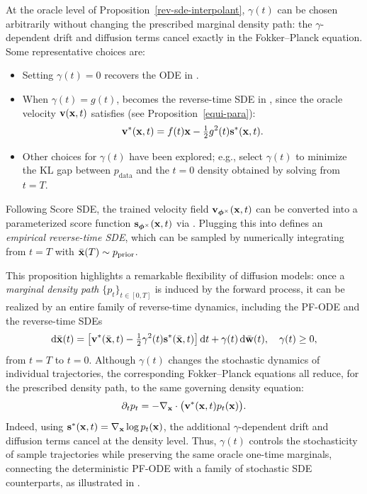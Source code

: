 At the oracle level of Proposition~\ref{rev-sde-interpolant},
$\gamma(t)$ can be chosen arbitrarily without changing the prescribed
marginal density path: the $\gamma$-dependent drift and diffusion terms cancel
exactly in the Fokker--Planck equation. Some representative choices are:
\begin{itemize}
    \item Setting $\gamma(t) = 0$ recovers the ODE in .
    \item When $\gamma(t) = g(t)$,  becomes the reverse-time SDE in , since the oracle velocity ${\mathbf{v}}({\mathbf{x}}, t)$ satisfies (see Proposition~\ref{equi-para}):
    \[
    {\mathbf{v}}^*({\mathbf{x}}, t) = f(t){\mathbf{x}} - \tfrac{1}{2}g^2(t){\mathbf{s}}^*({\mathbf{x}}, t).
    \]
    \item Other choices for $\gamma(t)$ have been explored; e.g., \citet{ma2024sit} select $\gamma(t)$ to minimize the KL gap between $p_{\mathrm{data}}$ and the $t=0$ density obtained by solving  from $t=T$.
\end{itemize}
Following Score SDE, the trained velocity field ${\mathbf{v}}_{\bm{\phi}^\times}({\mathbf{x}}, t)$ can be converted into a parameterized score function ${\mathbf{s}}_{\bm{\phi}^\times}({\mathbf{x}}, t)$ via . Plugging this into  defines an \emph{empirical reverse-time SDE}, which can be sampled by numerically integrating from $t=T$ with $\bar{{\mathbf{x}}}(T) \sim p_{\mathrm{prior}}$.

This proposition highlights a remarkable flexibility of diffusion models:
once a \emph{marginal density path} $\{p_t\}_{t\in[0,T]}$ is induced by the
forward process, it can be realized by an entire family of reverse-time
dynamics, including the PF-ODE and the reverse-time SDEs
\[
\mathop{}\!\mathrm{d}\bar{{\mathbf{x}}}(t)
=
\big[
{\mathbf{v}}^*(\bar{{\mathbf{x}}},t)
-\tfrac12\gamma^2(t){\mathbf{s}}^*(\bar{{\mathbf{x}}},t)
\big]\mathop{}\!\mathrm{d} t
+
\gamma(t)\mathop{}\!\mathrm{d}\bar{{\mathbf{w}}}(t),
\quad
\gamma(t)\geq0,
\]
from $t=T$ to $t=0$. Although $\gamma(t)$ changes the stochastic dynamics of individual
trajectories, the corresponding Fokker--Planck equations all reduce, for the
prescribed density path, to the same governing density equation:
\[
\partial_t p_t
=
-\nabla_{{\mathbf{x}}}\cdot
\bigl({\mathbf{v}}^*({\mathbf{x}},t)p_t({\mathbf{x}})\bigr).
\]
Indeed, using
${\mathbf{s}}^*({\mathbf{x}},t)=\nabla_{{\mathbf{x}}}\log p_t({\mathbf{x}})$, the additional
$\gamma$-dependent drift and diffusion terms cancel at the density level.
Thus, $\gamma(t)$ controls the stochasticity of sample trajectories while
preserving the same oracle one-time marginals, connecting the deterministic
PF-ODE with a family of stochastic SDE counterparts, as illustrated in
.


